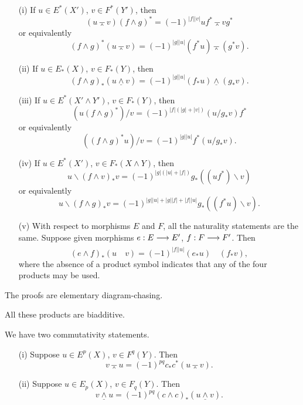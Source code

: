 \documentclass[../main]{subfiles}
\begin{document}
\begin{proposition}\label{prop:p3ch09.1}
\begin{enumerate}
    \item[(i)] If \(u \in E^\ast(X')\), \(v \in F^\ast(Y')\), then \[(u \barwedge v)(f \wedge g)^\ast = (-1)^{|f||v|} u f^\ast \barwedge v g^\ast\] or equivalently \[(f \wedge g)^\ast (u \barwedge v) = (-1)^{|g| |u|} (f^\ast u) \barwedge (g^\ast v).\]
    \item[(ii)] If \(u \in E_\ast(X)\), \(v \in F_\ast(Y)\), then \[(f \wedge g)_\ast(u \underline \wedge v) = (-1)^{|g| |u|} (f_\ast u) \underline \wedge (g_\ast v).\] 
    \item[(iii)] If \(u \in E^\ast(X' \wedge Y')\), \(v \in F_\ast(Y)\), then \[(u(f \wedge g)^\ast)/v = (-1)^{|f|(|g| + |v|)} (u/g_\ast v)f^\ast\] or equivalently \[((f \wedge g)^\ast u)/v = (-1)^{|g| |u|} f^\ast (u/g_\ast v).\]
    \item[(iv)] If \(u \in E^\ast(X')\), \(v \in F_\ast(X \wedge Y)\), then \[u \backslash (f \wedge v)_\ast v = (-1)^{|g|(|u| + |f|)} g_\ast((uf^\ast) \backslash v)\] or equivalently \[u \backslash (f \wedge g)_\ast v = (-1)^{|g| |u| + |g| |f| + |f| |u|} g_\ast((f^\ast u) \backslash v).\]
    \item[(v)] With respect to morphisms $E$ and $F$, all the naturality statements are the same. Suppose given morphisms $e : E \lar{} E'$, $f : F \lar{} F'$. Then \[(e \wedge f)_\ast (u \quad v) = (-1)^{|f| |u|} (e_\ast u) \quad (f_\ast v),\] where the absence of a product symbol indicates that any of the four products may be used. 
\end{enumerate}
\end{proposition}

The proofs are elementary diagram-chasing.

\begin{proposition}\label{prop:p3ch09.2}
All these products are biadditive.
\end{proposition}

We have two commutativity statements. 

\begin{proposition}\label{prop:p3ch09.3}
\begin{itemize}
    \item[(i)] Suppose \(u \in E^p(X)\), \(v \in F^q(Y)\). Then \[v \barwedge u = (-1)^{pq} c_\ast c^\ast(u \barwedge v).\]
    \item[(ii)] Suppose \(u \in E_p(X)\), \(v \in F_q(Y)\). Then \[v \underline \wedge u = (-1)^{pq} (c \wedge c)_\ast (u \underline \wedge v).\]
\end{itemize}
\end{proposition}
\end{document}
